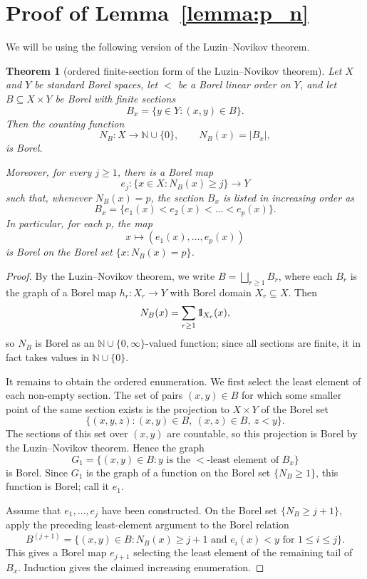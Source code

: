 \documentclass[11pt]{paper}
\newtheorem{theorem}{Theorem}
\def\done{{1\hskip-2.5pt{\rm l}}}
\newcommand{\bN}{\mathbb N}
\begin{document}
\section{Proof of Lemma~\ref{lemma:p_n} }\label{AppB}
We will be using the following  version of the Luzin--Novikov theorem.
\begin{theorem}[ordered finite-section form of the Luzin--Novikov theorem]\label{thm:L-N-ordered}
Let $X$ and $Y$ be standard Borel spaces, let $<$ be a Borel linear order on $Y$, and let
$B\subseteq X\times Y$ be Borel with finite sections
\[
B_x=\{y\in Y\colon (x,y)\in B\}.
\]
Then the counting function
\[
N_B\colon X\to\bN \cup \{0\},\qquad N_B(x)=|B_x|,
\]
is Borel.

Moreover, for every $j\ge1$, there is a Borel map
\[
e_j\colon \{x\in X\colon N_B(x)\ge j\}\to Y
\]
such that, whenever $N_B(x)=p$, the section $B_x$ is listed in increasing order as
\[
B_x=\{e_1(x)<e_2(x)<\ldots<e_p(x)\}.
\]
In particular, for each $p$, the map
\[
x\mapsto (e_1(x),\ldots,e_p(x))
\]
is Borel on the Borel set $\{x\colon N_B(x)=p\}$.
\end{theorem}
\begin{proof}
By the Luzin--Novikov theorem, we write $B=\bigsqcup_{r\ge1} B_r$, where each $B_r$ is the graph of a Borel map
$h_r\colon X_r\to Y$ with Borel domain $X_r\subseteq X$. Then
\[
N_B(x)=\sum_{r\ge1}\done_{X_r}(x),
\]
so $N_B$ is Borel as an $\bN\cup\{0,\infty\}$-valued function; since all sections are finite, it in fact takes values in $\bN\cup\{0\}$.

It remains to obtain the ordered enumeration. We first select the least element of each non-empty section.
The set of pairs $(x,y)\in B$ for which some smaller point of the same section exists is the projection to
$X\times Y$ of the Borel set
\[
\{(x,y,z)\colon (x,y)\in B,\ (x,z)\in B,\ z<y\}.
\]
The sections of this set over $(x,y)$ are countable, so this projection is Borel by the Luzin--Novikov theorem.
Hence the graph
\[
G_1=\{(x,y)\in B\colon y\text{ is the }<\text{-least element of }B_x\}
\]
is Borel. Since $G_1$ is the graph of a function on the Borel set $\{N_B\ge1\}$, this function is Borel; call it $e_1$.

Assume that $e_1,\ldots,e_j$ have been constructed. On the Borel set $\{N_B\ge j+1\}$, apply the preceding least-element argument to the Borel relation
\[
B^{(j+1)}=\{(x,y)\in B\colon N_B(x)\ge j+1\text{ and }e_i(x)<y\text{ for }1\le i\le j\}.
\]
This gives a Borel map $e_{j+1}$ selecting the least element of the remaining tail of $B_x$. Induction gives the claimed increasing enumeration.
\end{proof}
\end{document}
